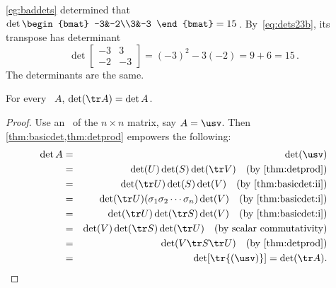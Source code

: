 \begin{example} 
\autoref{eg:baddets} determined that
\(\det\begin{bmat} -3&-2\\3&-3 \end{bmat}=15\)\,.
By~\eqref{eq:dets23b}, its transpose has determinant
\begin{equation*}
\det\begin{bmatrix} -3&3\\-2&-3 \end{bmatrix}
=(-3)^2-3(-2)=9+6=15\,.
\end{equation*}
The determinants are the same.
\end{example}




\begin{theorem} \label{thm:dettr} 
For every ~\(A\), \(\det(\tr A)=\det A\).
\end{theorem}
\begin{proof} 
Use an \svd\ of the \(n\times n\) matrix, say \(A=\usv\).
Then \cref{thm:basicdet,thm:detprod} empowers the following:
\begin{eqnarray*}
\det A&=&\det(\usv)
\\&=&\det(U)\det(S)\det(\tr V)\quad(\text{by \autoref{thm:detprod}})
\\&=&\det(\tr U)\det(S)\det(V)\quad(\text{by \autoref{thm:basicdet:ii}})
\\&=&\det(\tr U)(\sigma_1\sigma_2\cdots\sigma_n)\det(V)\quad(\text{by \autoref{thm:basicdet:i}})
\\&=&\det(\tr U)\det(\tr S)\det(V)\quad(\text{by \autoref{thm:basicdet:i}})
\\&=&\det(V)\det(\tr S)\det(\tr U)\quad(\text{by scalar commutativity})
\\&=&\det(V\tr S\tr U)\quad(\text{by \autoref{thm:detprod}})
\\&=&\det[\tr{(\usv)}]=\det(\tr A).
\end{eqnarray*}
\end{proof}

